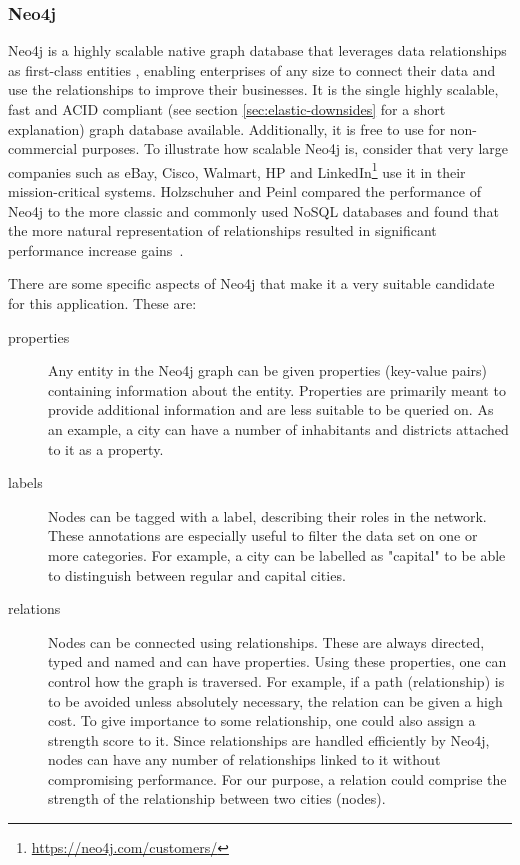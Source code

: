 \subsubsection{Neo4j}
Neo4j is a highly scalable native graph database that leverages data relationships as first-class entities \cite{neo4j}, enabling enterprises of any size to connect their data and use the relationships to improve their businesses. It is the single highly scalable, fast and ACID compliant \todo (see section \ref{sec:elastic-downsides} for a short explanation) graph database available. Additionally, it is free to use for non-commercial purposes. To illustrate how scalable Neo4j is, consider that very large companies such as eBay, Cisco, Walmart, HP and LinkedIn\footnote{\url{https://neo4j.com/customers/}} use it in their mission-critical systems. Holzschuher and Peinl compared the performance of Neo4j to the more classic and commonly used NoSQL databases and found that the more natural representation of relationships resulted in significant performance increase gains~\cite{holzschuher2013performance}.

There are some specific aspects of Neo4j that make it a very suitable candidate for this application. These are:

\begin{description}
\item[properties] Any entity in the Neo4j graph can be given properties (key-value pairs) containing information about the entity. Properties are primarily meant to provide additional information and are less suitable to be queried on. As an example, a city can have a number of inhabitants and districts attached to it as a property.
\item[labels] Nodes can be tagged with a label, describing their roles in the network. These annotations are especially useful to filter the data set on one or more categories. For example, a city can be labelled as "capital" to be able to distinguish between regular and capital cities.
\item[relations] Nodes can be connected using relationships. These are always directed, typed and named and can have properties. Using these properties, one can control how the graph is traversed. For example, if a path (relationship) is to be avoided unless absolutely necessary, the relation can be given a high cost. To give importance to some relationship, one could also assign a strength score to it. Since relationships are handled efficiently by Neo4j, nodes can have any number of relationships linked to it without compromising performance. For our purpose, a relation could comprise the strength of the relationship between two cities (nodes).
\end{description}

